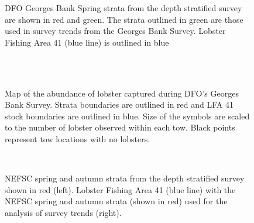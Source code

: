 \documentclass[11pt]{article}
\newcommand{\D}{.}
\newcommand{\e}{/backup/bio_data/bio.lobster/figures/} %
\begin{document}
\begin{figure}

    \caption{DFO Georges Bank Spring strata from the depth stratified survey are shown in red and green. The strata outlined in green are those used in survey trends from the Georges Bank Survey. Lobster Fishing Area 41 (blue line) is outlined in blue}

\end{figure}

\begin{landscape}


        \begin{figure}
        \centering
        \\
        \\

         \caption{Map of the abundance of lobster captured during DFO's Georges Bank Survey. Strata boundaries are outlined in red and LFA 41 stock boundaries are outlined in blue. Size of the symbols are scaled to the number of lobster observed within each tow. Black points represent tow locations with no lobsters.}
        \end{figure}
        \clearpage






\begin{figure}
\centering
        \\
\caption{NEFSC spring and autumn strata from the depth stratified survey shown in red (left). Lobster Fishing Area 41 (blue line) with the NEFSC spring and autumn strata (shown in red) used for the analysis of survey trends (right).}
\end{figure}


\end{landscape}
\end{document}
